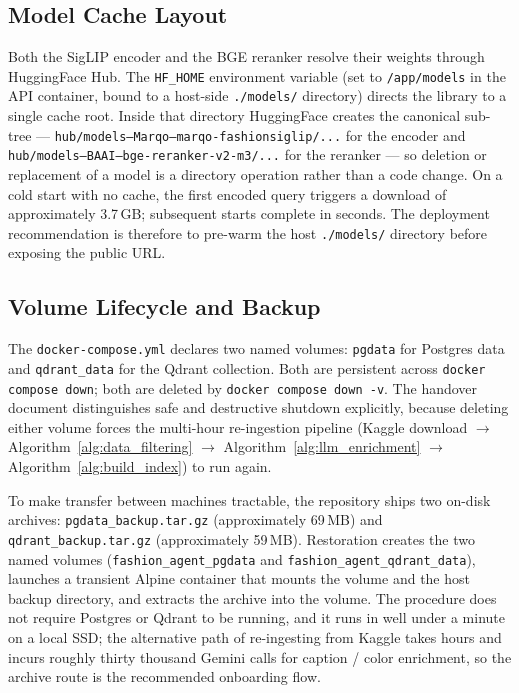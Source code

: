 \subsection{Model Cache Layout}

Both the SigLIP encoder and the BGE reranker resolve their weights through HuggingFace Hub. The \texttt{HF\_HOME} environment variable (set to \texttt{/app/models} in the API container, bound to a host-side \texttt{./models/} directory) directs the library to a single cache root. Inside that directory HuggingFace creates the canonical sub-tree --- \texttt{hub/models--Marqo--marqo-fashionsiglip/...} for the encoder and \texttt{hub/models--BAAI--bge-reranker-v2-m3/...} for the reranker --- so deletion or replacement of a model is a directory operation rather than a code change. On a cold start with no cache, the first encoded query triggers a download of approximately 3.7\,GB; subsequent starts complete in seconds. The deployment recommendation is therefore to pre-warm the host \texttt{./models/} directory before exposing the public URL.

\subsection{Volume Lifecycle and Backup}

The \texttt{docker-compose.yml} declares two named volumes: \texttt{pgdata} for Postgres data and \texttt{qdrant\_data} for the Qdrant collection. Both are persistent across \texttt{docker compose down}; both are deleted by \texttt{docker compose down -v}. The handover document distinguishes safe and destructive shutdown explicitly, because deleting either volume forces the multi-hour re-ingestion pipeline (Kaggle download $\rightarrow$ Algorithm~\ref{alg:data_filtering} $\rightarrow$ Algorithm~\ref{alg:llm_enrichment} $\rightarrow$ Algorithm~\ref{alg:build_index}) to run again.

To make transfer between machines tractable, the repository ships two on-disk archives: \texttt{pgdata\_backup.tar.gz} (approximately 69\,MB) and \texttt{qdrant\_backup.tar.gz} (approximately 59\,MB). Restoration creates the two named volumes (\texttt{fashion\_agent\_pgdata} and \texttt{fashion\_agent\_qdrant\_data}), launches a transient Alpine container that mounts the volume and the host backup directory, and extracts the archive into the volume. The procedure does not require Postgres or Qdrant to be running, and it runs in well under a minute on a local SSD; the alternative path of re-ingesting from Kaggle takes hours and incurs roughly thirty thousand Gemini calls for caption / color enrichment, so the archive route is the recommended onboarding flow.


